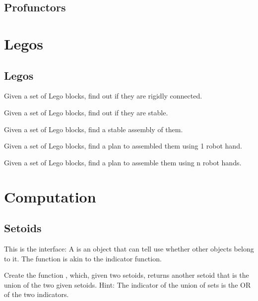 

\section{Profunctors}



\chapter{Legos}


\section{Legos}

\begin{exercise}
  Given a set of Lego blocks, find out if they are rigidly connected.
\end{exercise}
\begin{exercise}
  Given a set of Lego blocks, find out if they are stable.
\end{exercise}
\begin{exercise}
  Given a set of Lego blocks, find a stable assembly of them.
\end{exercise}
\begin{exercise}
  Given a set of Lego blocks, find a plan to assembled them using 1 robot hand.
\end{exercise}
\begin{exercise}
  Given a set of Lego blocks, find a plan to assemble them using n robot hands.
\end{exercise}


\chapter{Computation}


\section{Setoids}

This is the \Setoid interface:
%
%
A \Setoid is an object that can tell use whether other objects belong to it.
The  function is akin to the indicator function.


\begin{exercise}
  Create the function , which, given two setoids, returns another setoid that is the union of the two given setoids.
%
%
  Hint: The indicator of the union of sets is the OR of the two indicators.
\end{exercise}

